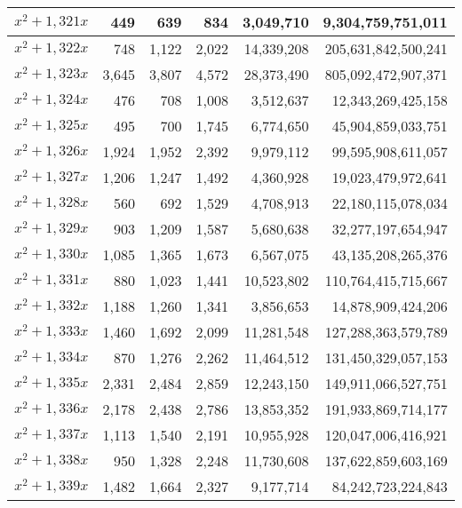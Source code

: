 \documentclass[a4paper]{amsproc}
\theoremstyle{plain}
\theoremstyle{named}
\begin{document}
\begin{longtable}{ | l | r | r | r | r | r | }
$x^2 + 1{,}321x$ & 449 & 639 & 834 & 3{,}049{,}710 & 9{,}304{,}759{,}751{,}011 \\ \hline
$x^2 + 1{,}322x$ & 748 & 1{,}122 & 2{,}022 & 14{,}339{,}208 & 205{,}631{,}842{,}500{,}241 \\ \hline
$x^2 + 1{,}323x$ & 3{,}645 & 3{,}807 & 4{,}572 & 28{,}373{,}490 & 805{,}092{,}472{,}907{,}371 \\ \hline
$x^2 + 1{,}324x$ & 476 & 708 & 1{,}008 & 3{,}512{,}637 & 12{,}343{,}269{,}425{,}158 \\ \hline
$x^2 + 1{,}325x$ & 495 & 700 & 1{,}745 & 6{,}774{,}650 & 45{,}904{,}859{,}033{,}751 \\ \hline
$x^2 + 1{,}326x$ & 1{,}924 & 1{,}952 & 2{,}392 & 9{,}979{,}112 & 99{,}595{,}908{,}611{,}057 \\ \hline
$x^2 + 1{,}327x$ & 1{,}206 & 1{,}247 & 1{,}492 & 4{,}360{,}928 & 19{,}023{,}479{,}972{,}641 \\ \hline
$x^2 + 1{,}328x$ & 560 & 692 & 1{,}529 & 4{,}708{,}913 & 22{,}180{,}115{,}078{,}034 \\ \hline
$x^2 + 1{,}329x$ & 903 & 1{,}209 & 1{,}587 & 5{,}680{,}638 & 32{,}277{,}197{,}654{,}947 \\ \hline
$x^2 + 1{,}330x$ & 1{,}085 & 1{,}365 & 1{,}673 & 6{,}567{,}075 & 43{,}135{,}208{,}265{,}376 \\ \hline
$x^2 + 1{,}331x$ & 880 & 1{,}023 & 1{,}441 & 10{,}523{,}802 & 110{,}764{,}415{,}715{,}667 \\ \hline
$x^2 + 1{,}332x$ & 1{,}188 & 1{,}260 & 1{,}341 & 3{,}856{,}653 & 14{,}878{,}909{,}424{,}206 \\ \hline
$x^2 + 1{,}333x$ & 1{,}460 & 1{,}692 & 2{,}099 & 11{,}281{,}548 & 127{,}288{,}363{,}579{,}789 \\ \hline
$x^2 + 1{,}334x$ & 870 & 1{,}276 & 2{,}262 & 11{,}464{,}512 & 131{,}450{,}329{,}057{,}153 \\ \hline
$x^2 + 1{,}335x$ & 2{,}331 & 2{,}484 & 2{,}859 & 12{,}243{,}150 & 149{,}911{,}066{,}527{,}751 \\ \hline
$x^2 + 1{,}336x$ & 2{,}178 & 2{,}438 & 2{,}786 & 13{,}853{,}352 & 191{,}933{,}869{,}714{,}177 \\ \hline
$x^2 + 1{,}337x$ & 1{,}113 & 1{,}540 & 2{,}191 & 10{,}955{,}928 & 120{,}047{,}006{,}416{,}921 \\ \hline
$x^2 + 1{,}338x$ & 950 & 1{,}328 & 2{,}248 & 11{,}730{,}608 & 137{,}622{,}859{,}603{,}169 \\ \hline
$x^2 + 1{,}339x$ & 1{,}482 & 1{,}664 & 2{,}327 & 9{,}177{,}714 & 84{,}242{,}723{,}224{,}843 \\ \hline

\end{longtable}
\end{document}
